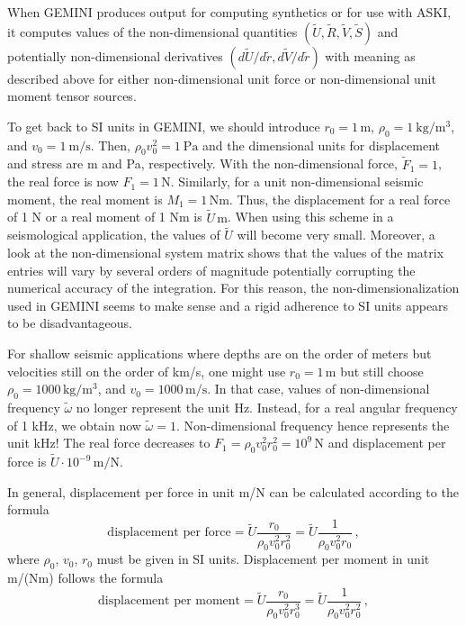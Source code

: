 \documentclass[11pt,a4paper]{article}
\begin{document}
When GEMINI produces output for computing synthetics or for use with ASKI, it computes values of the non-dimensional
quantities $(\tilde{U},\tilde{R},\tilde{V},\tilde{S})$ and potentially non-dimensional derivatives
$(d\tilde{U}/d\tilde{r},d\tilde{V}/d\tilde{r})$ with meaning as described above for either non-dimensional unit force
or non-dimensional unit moment tensor sources.

To get back to SI units in GEMINI, we should introduce $r_0 = 1\,\mbox{m}$, $\rho_0 = 1\ \mbox{kg}/\mbox{m}^3$, and 
$v_0 = 1\ \mbox{m}/\mbox{s}$. Then, $\rho_0v_0^2 = 1\ \mbox{Pa}$ and the dimensional units for displacement and stress are
m and Pa, respectively. With the non-dimensional force, $\tilde{F}_1 = 1$, the real force is now $F_1 = 1\,\mbox{N}$.
Similarly, for a unit non-dimensional seismic moment, the real moment is $M_1 = 1\,\mbox{Nm}$. Thus, the displacement
for a real force of 1 N or a real moment of 1 Nm is $\tilde{U}\,\mbox{m}$. When using this scheme in a seismological
application, the values of $\tilde{U}$ will become very small. Moreover, a look at the non-dimensional system matrix shows that the
values of the matrix entries will vary by several orders of magnitude potentially corrupting the numerical
accuracy of the integration. For this reason, the non-dimensionalization used in GEMINI seems to make sense and
a rigid adherence to SI units appears to be disadvantageous.

For shallow seismic applications where depths are on the order of meters but velocities still on the order of km/s,
one might use $r_0 = 1\,\mbox{m}$ but still choose $\rho_0 = 1000\,\mbox{kg}/\mbox{m}^3$, and $v_0 = 1000\,\mbox{m}/\mbox{s}$.
In that case, values of non-dimensional frequency $\tilde{\omega}$ no longer represent the unit Hz.
Instead, for a real angular frequency of 1 kHz, we obtain now $\tilde{\omega} = 1$. Non-dimensional frequency hence
represents the unit kHz! The real force decreases to $F_1 = \rho_0v_0^2r_0^2 = 10^9\,\mbox{N}$ and displacement per force
is $\tilde{U}\cdot 10^{-9}\,\mbox{m}/\mbox{N}$.

In general, displacement per force in unit m/N can be calculated according to the formula 
\begin{displaymath}
\mbox{displacement per force} = \tilde{U}\frac{r_0}{\rho_0v_0^2r_0^2} = \tilde{U}\frac{1}{\rho_0v_0^2r_0} \,,
\end{displaymath}
where $\rho_0$, $v_0$, $r_0$ must be given in SI units. Displacement per moment in unit m/(Nm) follows the formula
\begin{displaymath}
\mbox{displacement per moment} = \tilde{U}\frac{r_0}{\rho_0v_0^2r_0^3} = \tilde{U}\frac{1}{\rho_0v_0^2r_0^2} \,,
\end{displaymath}
%
\end{document}
